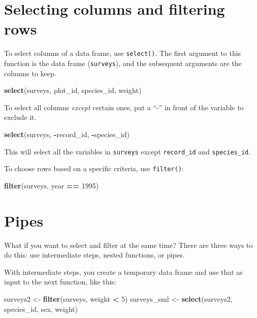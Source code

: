 \documentclass[]{book}
\newenvironment{Shaded}{\begin{snugshade}}{\end{snugshade}}
\newcommand{\KeywordTok}[1]{\textcolor[rgb]{0.13,0.29,0.53}{\textbf{#1}}}
\newcommand{\DecValTok}[1]{\textcolor[rgb]{0.00,0.00,0.81}{#1}}
\newcommand{\StringTok}[1]{\textcolor[rgb]{0.31,0.60,0.02}{#1}}
\newcommand{\OperatorTok}[1]{\textcolor[rgb]{0.81,0.36,0.00}{\textbf{#1}}}
\newcommand{\NormalTok}[1]{#1}
\begin{document}
\section{Selecting columns and filtering
rows}\label{selecting-columns-and-filtering-rows}

To select columns of a data frame, use \texttt{select()}. The first
argument to this function is the data frame (\texttt{surveys}), and the
subsequent arguments are the columns to keep.

\begin{Shaded}
\begin{Highlighting}[]
\KeywordTok{select}\NormalTok{(surveys, plot_id, species_id, weight)}
\end{Highlighting}
\end{Shaded}

To select all columns \emph{except} certain ones, put a ``-'' in front
of the variable to exclude it.

\begin{Shaded}
\begin{Highlighting}[]
\KeywordTok{select}\NormalTok{(surveys, }\OperatorTok{-}\NormalTok{record_id, }\OperatorTok{-}\NormalTok{species_id)}
\end{Highlighting}
\end{Shaded}

This will select all the variables in \texttt{surveys} except
\texttt{record\_id} and \texttt{species\_id}.

To choose rows based on a specific criteria, use \texttt{filter()}:

\begin{Shaded}
\begin{Highlighting}[]
\KeywordTok{filter}\NormalTok{(surveys, year }\OperatorTok{==}\StringTok{ }\DecValTok{1995}\NormalTok{)}
\end{Highlighting}
\end{Shaded}

\section{Pipes}\label{pipes}

What if you want to select and filter at the same time? There are three
ways to do this: use intermediate steps, nested functions, or pipes.

With intermediate steps, you create a temporary data frame and use that
as input to the next function, like this:

\begin{Shaded}
\begin{Highlighting}[]
\NormalTok{surveys2 <-}\StringTok{ }\KeywordTok{filter}\NormalTok{(surveys, weight }\OperatorTok{<}\StringTok{ }\DecValTok{5}\NormalTok{)}
\NormalTok{surveys_sml <-}\StringTok{ }\KeywordTok{select}\NormalTok{(surveys2, species_id, sex, weight)}
\end{Highlighting}
\end{Shaded}
\end{document}
